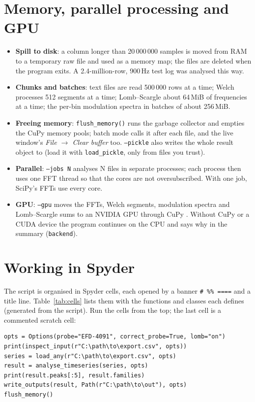 \documentclass[10pt,letterpaper]{article}
\numberwithin{equation}{section}
\begin{document}
\section{Memory, parallel processing and GPU}\label{sec:memory}
\begin{itemize}
\item \textbf{Spill to disk}: a column longer than 20\,000\,000 samples is moved
from RAM to a temporary raw file and used as a memory map; the files are
deleted when the program exits. A 2.4-million-row, 900\,Hz test log was
analysed this way.
\item \textbf{Chunks and batches}: text files are read 500\,000 rows at a time;
Welch processes 512 segments at a time; Lomb--Scargle about 64\,MiB of
frequencies at a time; the per-bin modulation spectra in batches of about
256\,MiB.
\item \textbf{Freeing memory}: \texttt{flush\_memory()} runs the garbage
collector and empties the CuPy memory pools; batch mode calls it after each
file, and the live window's \emph{File $\rightarrow$ Clear buffer} too.
\texttt{--pickle} also writes the whole result object to
 (load it with \texttt{load\_pickle}, only from files you
trust).
\item \textbf{Parallel}: \texttt{--jobs N} analyses N files in separate processes;
each process then uses one FFT thread so that the cores are not
oversubscribed. With one job, SciPy's FFTs use every core.
\item \textbf{GPU}: \texttt{--gpu} moves the FFTs, Welch segments, modulation
spectra and Lomb--Scargle sums to an NVIDIA GPU through CuPy \cite{B27}. Without
CuPy or a CUDA device the program continues on the CPU and says why in the
summary (\texttt{backend}).
\end{itemize}

\section{Working in Spyder}\label{sec:spyder}
The script is organised in Spyder cells, each opened by a banner
\verb|# %% ====| and a title line. Table~\ref{tab:cells} lists them with the
functions and classes each defines (generated from the script). Run the cells
from the top; the last cell is a commented scratch cell:
\begin{Verbatim}
opts = Options(probe="EFD-4091", correct_probe=True, lomb="on")
print(inspect_input(r"C:\path\to\export.csv", opts))
series = load_any(r"C:\path\to\export.csv", opts)
result = analyse_timeseries(series, opts)
print(result.peaks[:5], result.families)
write_outputs(result, Path(r"C:\path\to\out"), opts)
flush_memory()
\end{Verbatim}
\end{document}
